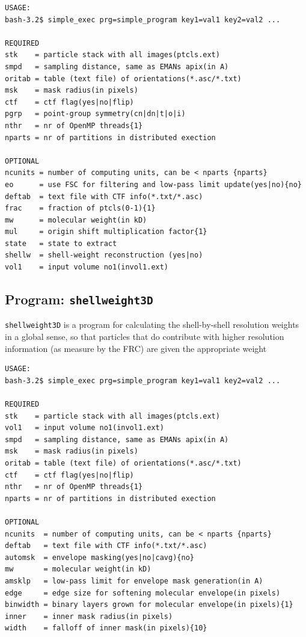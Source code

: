 \documentclass[a4paper,11pt]{article}
\newcommand{\prgname}[1]{\textcolor{NavyBlue}{\texttt{#1}}}
\begin{document}
\begin{verbatim}
USAGE:
bash-3.2$ simple_exec prg=simple_program key1=val1 key2=val2 ...

REQUIRED
stk    = particle stack with all images(ptcls.ext)
smpd   = sampling distance, same as EMANs apix(in A)
oritab = table (text file) of orientations(*.asc/*.txt)
msk    = mask radius(in pixels)
ctf    = ctf flag(yes|no|flip)
pgrp   = point-group symmetry(cn|dn|t|o|i)
nthr   = nr of OpenMP threads{1}
nparts = nr of partitions in distributed exection

OPTIONAL
ncunits = number of computing units, can be < nparts {nparts}
eo      = use FSC for filtering and low-pass limit update(yes|no){no}
deftab  = text file with CTF info(*.txt/*.asc)
frac    = fraction of ptcls(0-1){1}
mw      = molecular weight(in kD)
mul     = origin shift multiplication factor{1}
state   = state to extract
shellw  = shell-weight reconstruction (yes|no)
vol1    = input volume no1(invol1.ext)
\end{verbatim}

\subsection{Program: \prgname{shellweight3D}}
\label{shellweight3D}
\prgname{shellweight3D} is a program for calculating the shell-by-shell resolution weights in a global sense, so that particles that do contribute with higher resolution information (as measure by the FRC) are given the appropriate weight

\begin{verbatim}
USAGE:
bash-3.2$ simple_exec prg=simple_program key1=val1 key2=val2 ...

REQUIRED
stk    = particle stack with all images(ptcls.ext)
vol1   = input volume no1(invol1.ext)
smpd   = sampling distance, same as EMANs apix(in A)
msk    = mask radius(in pixels)
oritab = table (text file) of orientations(*.asc/*.txt)
ctf    = ctf flag(yes|no|flip)
nthr   = nr of OpenMP threads{1}
nparts = nr of partitions in distributed exection

OPTIONAL
ncunits  = number of computing units, can be < nparts {nparts}
deftab   = text file with CTF info(*.txt/*.asc)
automsk  = envelope masking(yes|no|cavg){no}
mw       = molecular weight(in kD)
amsklp   = low-pass limit for envelope mask generation(in A)
edge     = edge size for softening molecular envelope(in pixels)
binwidth = binary layers grown for molecular envelope(in pixels){1}
inner    = inner mask radius(in pixels)
width    = falloff of inner mask(in pixels){10}
\end{verbatim}
\end{document}
